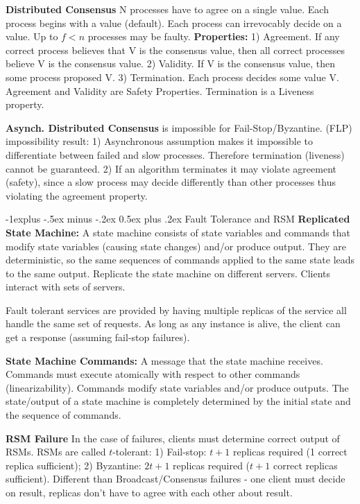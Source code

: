 \documentclass[6pt,landscape]{article}
\makeatletter
\renewcommand{\subsection}{\@startsection{subsection}{2}{0mm}%
                                {-1explus -.5ex minus -.2ex}%
                                {0.5ex plus .2ex}%
                                {\normalfont\normalsize\bfseries}}
\makeatother
\begin{document}
\begin{multicols}{3}
{\bf Distributed Consensus} N processes have to agree on a single value. Each process begins with a value (default). Each process can irrevocably decide on a value. Up to $f < n$ processes may be faulty. {\bf Properties:} 
1) Agreement. If any correct process believes that V is the consensus value, then all correct processes believe V is the consensus value.
2) Validity. If V is the consensus value, then some process proposed V.
3) Termination. Each process decides some value V. 
Agreement and Validity are Safety Properties. Termination is a Liveness property.

{\bf Asynch. Distributed Consensus} is impossible for Fail-Stop/Byzantine. (FLP) impossibility result: 1) Asynchronous assumption makes it impossible to differentiate between failed and slow processes. Therefore termination (liveness) cannot be guaranteed. 2) If an algorithm terminates it may violate agreement (safety), since a slow process may decide differently than other processes thus violating the agreement property.

\subsection{Fault Tolerance and RSM}
{\bf Replicated State Machine:} A state machine consists of state variables and commands that modify state variables (causing state changes) and/or produce output. They are deterministic, so the same sequences of commands applied to the same state leads to the same output. Replicate the state machine on different servers. Clients interact with sets of servers.

Fault tolerant services are provided by having multiple replicas of the service all handle the same set of requests. As long as any instance is alive, the client can get a response (assuming fail-stop failures).

{\bf State Machine Commands:} A message that the state machine receives. 
Commands must execute atomically with respect to other commands (linearizability). Commands modify state variables and/or produce outputs. The state/output of a state machine is completely determined by the initial state and the sequence of commands.

{\bf RSM Failure} In the case of failures, clients must determine correct output of RSMs. RSMs are called $t$-tolerant: 1) Fail-stop: $t + 1$ replicas required (1 correct replica sufficient); 2) Byzantine: $2t + 1$ replicas required ($t + 1$ correct replicas sufficient). Different than Broadcast/Consensus failures - one client must decide on result, replicas don't have to agree with each other about result.


\end{multicols}
\end{document}
